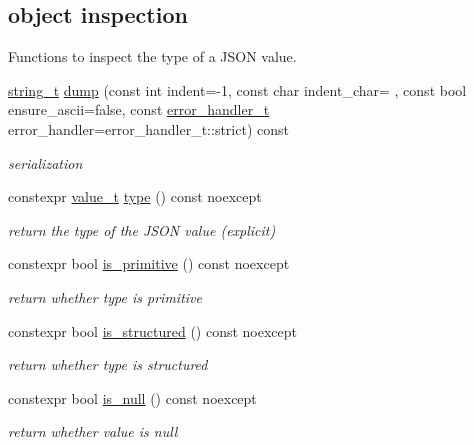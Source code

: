 \subsection*{object inspection}
\label{_amgrpbbb01a37b8f261ae5b5799058dcac1a0}%
Functions to inspect the type of a J\+S\+ON value. \begin{DoxyCompactItemize}
\item 
\hyperlink{classnlohmann_1_1basic__json_a33593865ffb1860323dcbd52425b90c8}{string\+\_\+t} \hyperlink{classnlohmann_1_1basic__json_ab1ec1c1d1bd4de221a527405d3406556}{dump} (const int indent=-\/1, const char indent\+\_\+char= \textquotesingle{} \textquotesingle{}, const bool ensure\+\_\+ascii=false, const \hyperlink{namespacenlohmann_1_1detail_a5a76b60b26dc8c47256a996d18d967df}{error\+\_\+handler\+\_\+t} error\+\_\+handler=error\+\_\+handler\+\_\+t\+::strict) const 
\begin{DoxyCompactList}\small\item\em serialization \end{DoxyCompactList}\item 
constexpr \hyperlink{namespacenlohmann_1_1detail_a1ed8fc6239da25abcaf681d30ace4985}{value\+\_\+t} \hyperlink{classnlohmann_1_1basic__json_a5b7c4b35a0ad9f97474912a08965d7ad}{type} () const noexcept
\begin{DoxyCompactList}\small\item\em return the type of the J\+S\+ON value (explicit) \end{DoxyCompactList}\item 
constexpr bool \hyperlink{classnlohmann_1_1basic__json_a548d2d4013da24e7d7510d90febc80c4}{is\+\_\+primitive} () const noexcept
\begin{DoxyCompactList}\small\item\em return whether type is primitive \end{DoxyCompactList}\item 
constexpr bool \hyperlink{classnlohmann_1_1basic__json_a4e05a7d5deec758f1d830741b68b4249}{is\+\_\+structured} () const noexcept
\begin{DoxyCompactList}\small\item\em return whether type is structured \end{DoxyCompactList}\item 
constexpr bool \hyperlink{classnlohmann_1_1basic__json_aedc7afad96292b5ab61a2e0ad3067f5f}{is\+\_\+null} () const noexcept
\begin{DoxyCompactList}\small\item\em return whether value is null \end{DoxyCompactList}\item 

\end{DoxyCompactItemize}

